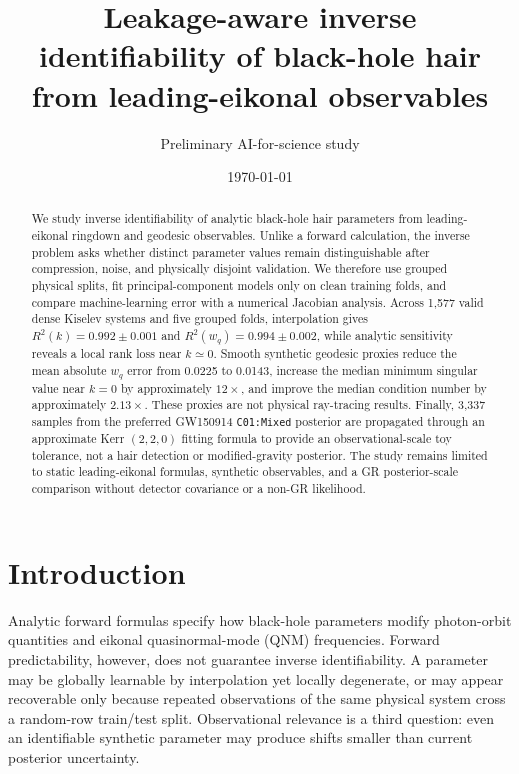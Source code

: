 \documentclass[11pt]{article}
\title{Leakage-aware inverse identifiability of black-hole hair from
leading-eikonal observables}
\author{Preliminary AI-for-science study}
\date{\today}
\begin{document}
\maketitle

\begin{abstract}
We study inverse identifiability of analytic black-hole hair parameters from
leading-eikonal ringdown and geodesic observables.  Unlike a forward calculation,
the inverse problem asks whether distinct parameter values remain distinguishable
after compression, noise, and physically disjoint validation.  We therefore use
grouped physical splits, fit principal-component models only on clean training
folds, and compare machine-learning error with a numerical Jacobian analysis.
Across 1,577 valid dense Kiselev systems and five grouped folds, interpolation gives
$R^2(k)=0.992\pm0.001$ and $R^2(w_q)=0.994\pm0.002$, while analytic sensitivity
reveals a local rank loss near $k\simeq0$.  Smooth synthetic geodesic proxies reduce
the mean absolute $w_q$ error from 0.0225 to 0.0143, increase the median minimum
singular value near $k=0$ by approximately $12\times$, and improve the median
condition number by approximately $2.13\times$.  These proxies are not physical
ray-tracing results.  Finally, 3,337 samples from the preferred GW150914
\texttt{C01:Mixed} posterior are propagated through an approximate Kerr
$(2,2,0)$ fitting formula to provide an observational-scale toy tolerance, not a
hair detection or modified-gravity posterior.  The study remains limited to static
leading-eikonal formulas, synthetic observables, and a GR posterior-scale
comparison without detector covariance or a non-GR likelihood.
\end{abstract}

\section{Introduction}

Analytic forward formulas specify how black-hole parameters modify photon-orbit
quantities and eikonal quasinormal-mode (QNM) frequencies.  Forward predictability,
however, does not guarantee inverse identifiability.  A parameter may be globally
learnable by interpolation yet locally degenerate, or may appear recoverable only
because repeated observations of the same physical system cross a random-row
train/test split.  Observational relevance is a third question: even an identifiable
synthetic parameter may produce shifts smaller than current posterior uncertainty.
\end{document}
